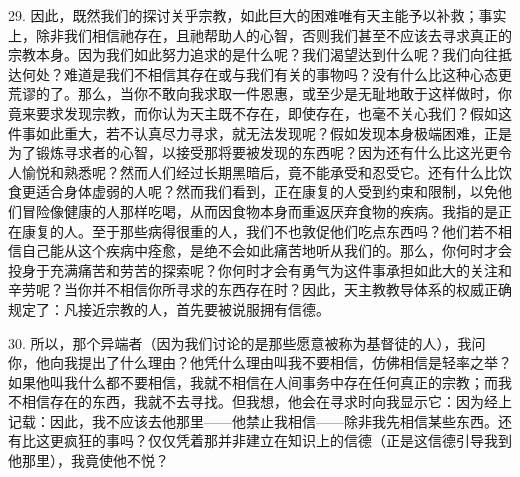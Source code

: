 29. 因此，既然我们的探讨关乎宗教，如此巨大的困难唯有天主能予以补救；事实上，除非我们相信祂存在，且祂帮助人的心智，否则我们甚至不应该去寻求真正的宗教本身。因为我们如此努力追求的是什么呢？我们渴望达到什么呢？我们向往抵达何处？难道是我们不相信其存在或与我们有关的事物吗？没有什么比这种心态更荒谬的了。那么，当你不敢向我求取一件恩惠，或至少是无耻地敢于这样做时，你竟来要求发现宗教，而你认为天主既不存在，即使存在，也毫不关心我们？假如这件事如此重大，若不认真尽力寻求，就无法发现呢？假如发现本身极端困难，正是为了锻炼寻求者的心智，以接受那将要被发现的东西呢？因为还有什么比这光更令人愉悦和熟悉呢？然而人们经过长期黑暗后，竟不能承受和忍受它。还有什么比饮食更适合身体虚弱的人呢？然而我们看到，正在康复的人受到约束和限制，以免他们冒险像健康的人那样吃喝，从而因食物本身而重返厌弃食物的疾病。我指的是正在康复的人。至于那些病得很重的人，我们不也敦促他们吃点东西吗？他们若不相信自己能从这个疾病中痊愈，是绝不会如此痛苦地听从我们的。那么，你何时才会投身于充满痛苦和劳苦的探索呢？你何时才会有勇气为这件事承担如此大的关注和辛劳呢？当你并不相信你所寻求的东西存在时？因此，天主教教导体系的权威正确规定了：凡接近宗教的人，首先要被说服拥有信德。\par

30. 所以，那个异端者（因为我们讨论的是那些愿意被称为基督徒的人），我问你，他向我提出了什么理由？他凭什么理由叫我不要相信，仿佛相信是轻率之举？如果他叫我什么都不要相信，我就不相信在人间事务中存在任何真正的宗教；而我不相信存在的东西，我就不去寻找。但我想，他会在寻求时向我显示它：因为经上记载：因此，我不应该去他那里——他禁止我相信——除非我先相信某些东西。还有比这更疯狂的事吗？仅仅凭着那并非建立在知识上的信德（正是这信德引导我到他那里），我竟使他不悦？\par

